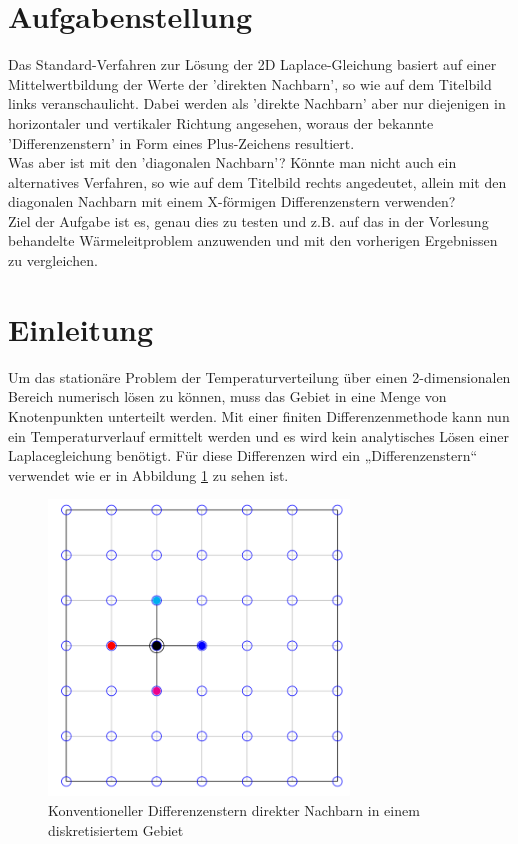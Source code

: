 \documentclass[twoside,10pt,a4paper]{article}
\numberwithin{equation}{section}					%
\numberwithin{figure}{section}						%
\begin{document}
\tableofcontents
\newpage
\section{Aufgabenstellung}
Das Standard-Verfahren zur Lösung der 2D Laplace-Gleichung basiert auf einer Mittelwertbildung der Werte der ’direkten Nachbarn’, so wie auf dem Titelbild links veranschaulicht. Dabei werden als ’direkte Nachbarn’ aber nur diejenigen in horizontaler und vertikaler Richtung angesehen, woraus der bekannte ’Differenzenstern’ in Form eines Plus-Zeichens resultiert.\\
Was aber ist mit den ’diagonalen Nachbarn’? Könnte man nicht auch ein alternatives Verfahren, so wie auf dem Titelbild rechts angedeutet, allein mit den diagonalen Nachbarn mit einem X-förmigen Differenzenstern verwenden?\\
Ziel der Aufgabe ist es, genau dies zu testen und z.B. auf das in der Vorlesung behandelte Wärmeleitproblem anzuwenden und mit den vorherigen Ergebnissen zu vergleichen.


\section{Einleitung}\label{sec:section1}
Um das stationäre Problem der Temperaturverteilung über einen 2-dimensionalen Bereich numerisch lösen zu können, muss das Gebiet in eine Menge von Knotenpunkten unterteilt werden. Mit einer finiten Differenzenmethode kann nun ein Temperaturverlauf ermittelt werden und es wird kein analytisches Lösen einer Laplacegleichung benötigt.
Für diese Differenzen wird ein „Differenzenstern“ verwendet wie er in Abbildung \ref{fig:1} zu sehen ist.

    \begin{figure}[h]
        \centering
        \includegraphics[width=8cm]{bilder/Picture2.png}
        \caption{Konventioneller Differenzenstern direkter Nachbarn in einem diskretisiertem Gebiet}
        \label{fig:1}
    \end{figure}
\end{document}
